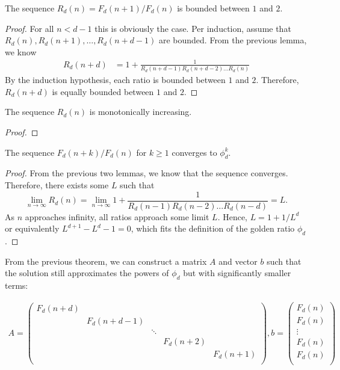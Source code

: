 \documentclass[english,version-2020-11]{uzl-thesis}
\begin{document}
\begin{lemma}
  The sequence $R_d(n) = F_d(n+1) / F_d(n)$ is bounded between $1$ and $2$.
\end{lemma}

\begin{proof}
  For all $n < d - 1$ this is obviously the case.
  Per induction, assume that $R_d(n), R_d(n+1), \dots, R_d(n+d-1)$ are bounded.
  From the previous lemma, we know
  \begin{align*}
    R_d(n+d)
    & = 1 + \frac{1}{R_d(n+d-1) R_d(n+d-2) \dots R_d(n)}
  \end{align*}
  By the induction hypothesis, each ratio is bounded between $1$ and $2$.
  Therefore, $R_d(n+d)$ is equally bounded between $1$ and $2$.
\end{proof}

\begin{lemma}
  The sequence $R_d(n)$ is monotonically increasing.
\end{lemma}

\begin{proof}

\end{proof}

\begin{theorem}
  The sequence $F_d(n + k) / F_d(n)$ for $k \ge 1$ converges to $\phi_d^k$.
\end{theorem}

\begin{proof}
  From the previous two lemmas, we know that the sequence converges.
  Therefore, there exists some $L$ such that
  \[
    \lim_{n \to \infty} R_d(n) = \lim_{n \to \infty} 1 + \frac{1}{R_d(n-1) R_d(n-2) \dots R_d(n-d)} = L.
  \]
  As $n$ approaches infinity, all ratios approach some limit $L$.
  Hence, $L = 1 + 1/L^d$ or equivalently $L^{d+1} - L^d - 1 = 0$,
  which fits the definition of the golden ratio $\phi_d$.
\end{proof}

From the previous theorem, we can construct a matrix $A$ and vector $b$ such that the solution
still approximates the powers of $\phi_d$ but with significantly smaller terms:

\begin{align*}
  A = \begin{pmatrix}
    F_d(n + d) \\
    & F_d(n + d - 1) \\
    && \ddots \\
    &&& F_d(n + 2) \\
    &&&& F_d(n + 1) \\
  \end{pmatrix},
  b =
  \begin{pmatrix}
    F_d(n) \\
    F_d(n) \\
    \vdots \\
    F_d(n) \\
    F_d(n) \\
  \end{pmatrix}
\end{align*}
\end{document}
